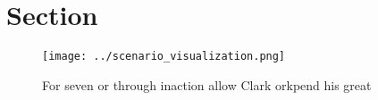 \documentclass[a4paper]{article}
\begin{document}
\section{Section}

\begin{figure}
\centering
\texttt{[image: ../scenario\_visualization.png]}
\caption{For seven or through inaction allow Clark orkpend his great
}
\end{figure}
 
\end{document}
